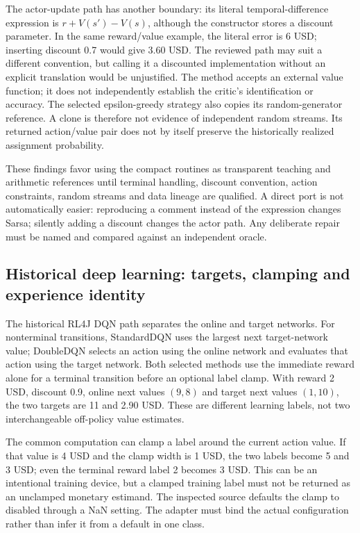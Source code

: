 The actor-update path has another boundary: its literal temporal-difference expression is $r+V(s')-V(s)$, although the constructor stores a discount parameter. In the same reward/value example, the literal error is 6 USD; inserting discount 0.7 would give 3.60 USD. The reviewed path may suit a different convention, but calling it a discounted implementation without an explicit translation would be unjustified. The method accepts an external value function; it does not independently establish the critic's identification or accuracy. The selected epsilon-greedy strategy also copies its random-generator reference. A clone is therefore not evidence of independent random streams. Its returned action/value pair does not by itself preserve the historically realized assignment probability.~\citep{exec24_policyjava_chen,exec24_policyjava_comparison}

These findings favor using the compact routines as transparent teaching and arithmetic references until terminal handling, discount convention, action constraints, random streams and data lineage are qualified. A direct port is not automatically easier: reproducing a comment instead of the expression changes Sarsa; silently adding a discount changes the actor path. Any deliberate repair must be named and compared against an independent oracle.

\subsection{Historical deep learning: targets, clamping and experience identity}
The historical RL4J DQN path separates the online and target networks. For nonterminal transitions, StandardDQN uses the largest next target-network value; DoubleDQN selects an action using the online network and evaluates that action using the target network. Both selected methods use the immediate reward alone for a terminal transition before an optional label clamp. With reward 2 USD, discount 0.9, online next values $(9,8)$ and target next values $(1,10)$, the two targets are 11 and 2.90 USD. These are different learning labels, not two interchangeable off-policy value estimates.~\citep{exec24_policyjava_rl4j,exec24_policyjava_comparison}

The common computation can clamp a label around the current action value. If that value is 4 USD and the clamp width is 1 USD, the two labels become 5 and 3 USD; even the terminal reward label 2 becomes 3 USD. This can be an intentional training device, but a clamped training label must not be returned as an unclamped monetary estimand. The inspected source defaults the clamp to disabled through a NaN setting. The adapter must bind the actual configuration rather than infer it from a default in one class.~\citep{exec24_policyjava_rl4j,exec24_policyjava_comparison}

